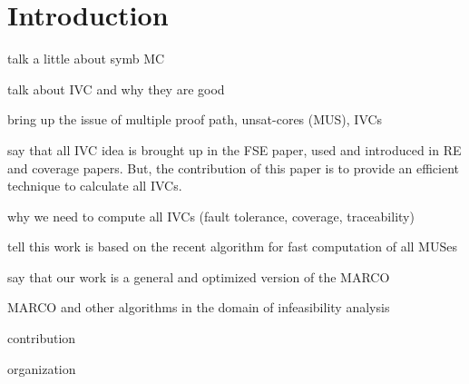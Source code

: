 \section{Introduction}
\label{sec:intro}

talk a little about symb MC

talk about IVC and why they are good

bring up the issue of multiple proof path, unsat-cores (MUS), IVCs

say that all IVC idea is brought up in the FSE paper, used and introduced in RE and coverage papers. But, the contribution of this paper is to provide an efficient technique to calculate all IVCs.

why we need to compute all IVCs (fault tolerance, coverage, traceability)

tell this work is based on the recent algorithm for fast computation of all MUSes

say that our work is a general and optimized version of the MARCO

MARCO and other algorithms in the domain of infeasibility analysis

contribution

organization

